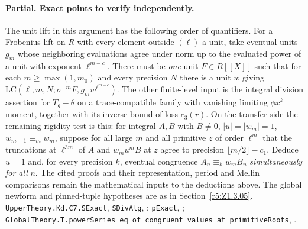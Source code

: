 \paragraph{Partial. Exact points to verify independently.}
The unit lift in this argument has the following order of quantifiers.
For a Frobenius lift on $R$ with every element outside $(\ell)$ a unit,
take eventual units $g_m$ whose neighboring evaluations agree under norm
up to the evaluated power of a unit with exponent $\ell^{m-c}$.
There must be \emph{one} unit $F\in R[[X]]$ such that for each
$m\ge\max(1,m_0)$ and every precision $N$ there is a unit $w$ giving
$\mathrm{LC}(\ell,m,N;\sigma^{-m}F,g_m w^{\ell^{m-c}})$.
The other finite-level input is the integral division assertion for
$T_g-\theta$ on a trace-compatible family with vanishing limiting
$\phi x^k$ moment, together with its inverse bound of loss $c_3(r)$.
On the transfer side the remaining rigidity test is this: for integral
$A,B$ with $B\ne0$, $|u|=|w_m|=1$, $w_{m+1}\equiv_m w_m$,
suppose for all large $m$ and all primitive $z$ of order $\ell^m$ that
the truncations at $\ell^{3m}$ of $A$ and $w_m u^m B$ at $z$ agree
to precision $\lfloor m/2\rfloor-c_1$. Deduce $u=1$ and, for every
precision $k$, eventual congruence $A_n\equiv_k w_m B_n$
\emph{simultaneously for all} $n$. The cited proofs and their
representation, period and Mellin comparisons remain the mathematical
inputs to the deductions above. The global newform and pinned-tuple
hypotheses are as in Section~\ref{r5:Z1.3.05}.
{\footnotesize\nolinkurl{UpperTheory.Kd.C7.SExact}, \nolinkurl{SDivAlg},
;
\nolinkurl{pExact}, ;
\nolinkurl{GlobalTheory.T.powerSeries_eq_of_congruent_values_at_primitiveRoots},
.}

